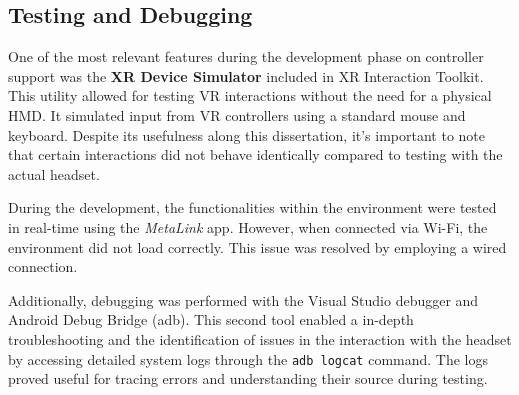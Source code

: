 
\subsection{Testing and Debugging}

One of the most relevant features during the development phase on controller support was the \textbf{XR Device Simulator} included in XR Interaction Toolkit. 
This utility allowed for testing \gls{VR} interactions without the need for a physical \gls{HMD}. 
It simulated input from \gls{VR} controllers using a standard mouse and keyboard. 
Despite its usefulness along this dissertation, it's important to note that certain interactions did not behave identically compared to testing with the actual headset.

During the development, the functionalities within the environment were tested in real-time using the \emph{MetaLink} app. However, when connected via Wi-Fi, the environment did not load correctly. This issue was resolved by employing a wired connection.

Additionally, debugging was performed with the Visual Studio debugger and Android Debug Bridge (adb). 
This second tool enabled a in-depth troubleshooting and the identification of issues in the interaction with the headset by accessing detailed system logs through the \texttt{adb logcat} command. The logs proved useful for tracing errors and understanding their source during testing.







